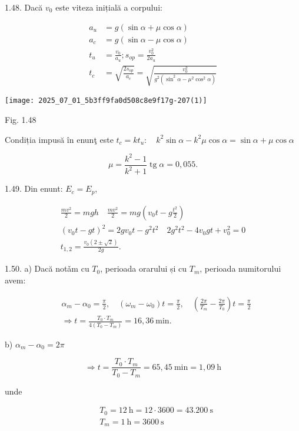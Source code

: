 1.48. Dacă $v_{0}$ este viteza inițială a corpului:

$$
\begin{aligned}
a_{u} & =g(\sin \alpha+\mu \cos \alpha) \\
a_{c} & =g(\sin \alpha-\mu \cos \alpha) \\
t_{u} & =\frac{v_{0}}{a_{u}} ; s_{o p}=\frac{v_{0}^{2}}{2 a_{u}} \\
t_{c} & =\sqrt{\frac{2 s_{o p}}{a_{c}}}=\sqrt{\frac{v_{0}^{2}}{g^{2}\left(\sin ^{2} \alpha-\mu^{2} \cos ^{2} \alpha\right)}}
\end{aligned}
$$

\begin{center}
\texttt{[image: 2025\_07\_01\_5b3ff9fa0d508c8e9f17g-207(1)]}
\end{center}

Fig. 1.48

Condiția impusă în enunţ este $t_{c}=k t_{u}: \quad k^{2} \sin \alpha-k^{2} \mu \cos \alpha=\sin \alpha+\mu \cos \alpha$

$$
\mu=\frac{k^{2}-1}{k^{2}+1} \operatorname{tg} \alpha=0,055 .
$$

1.49. Din enunt: $E_{c}=E_{p}$,

$$
\begin{gathered}
\frac{m v^{2}}{2}=m g h \quad \frac{m v^{2}}{2}=m g\left(v_{0} t-g \frac{t^{2}}{2}\right) \\
\left(v_{0} t-g t\right)^{2}=2 g v_{0} t-g^{2} t^{2} \quad 2 g^{2} t^{2}-4 v_{0} g t+v_{0}^{2}=0 \\
t_{1,2}=\frac{v_{0}(2 \pm \sqrt{2})}{2 g} .
\end{gathered}
$$

1.50. a) Dacă notǎm cu $T_{0}$, perioada orarului și cu $T_{m}$, perioada numitorului avem:

$$
\begin{aligned}
& \alpha_{m}-\alpha_{0}=\frac{\pi}{2}, \quad\left(\omega_{m}-\omega_{0}\right) t=\frac{\pi}{2}, \quad\left(\frac{2 \pi}{T_{m}}-\frac{2 \pi}{T_{0}}\right) t=\frac{\pi}{2} \\
& \Rightarrow t=\frac{T_{0} \cdot T_{m}}{4\left(T_{0}-T_{m}\right)}=16,36 \mathrm{~min} .
\end{aligned}
$$

b) $\alpha_{m}-\alpha_{0}=2 \pi$

$$
\Rightarrow t=\frac{T_{0} \cdot T_{m}}{T_{0}-T_{m}}=65,45 \mathrm{~min}=1,09 \mathrm{~h}
$$

unde

$$
\begin{aligned}
& T_{0}=12 \mathrm{~h}=12 \cdot 3600=43.200 \mathrm{~s} \\
& T_{m}=1 \mathrm{~h}=3600 \mathrm{~s}
\end{aligned}
$$

